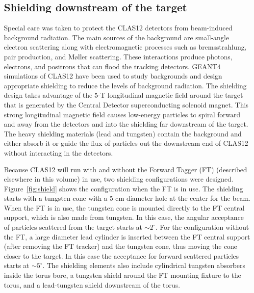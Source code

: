 \subsection{Shielding downstream of the target} 

Special care was taken to protect the CLAS12 detectors from beam-induced background radiation. The main sources of the background are 
small-angle electron scattering along with electromagnetic processes such as bremsstrahlung, pair production, and M{\o}ller scattering. 
These interactions produce photons, electrons, and positrons that can flood the tracking detectors. GEANT4 simulations of CLAS12
have been used to study backgrounds and design appropriate shielding to reduce the levels of background radiation.  The shielding design
takes advantage of the 5-T longitudinal magnetic field around the target that is generated by the Central Detector superconducting solenoid 
magnet. This strong longitudinal magnetic field causes low-energy particles to spiral forward and away from the detectors and into the 
shielding far downstream of the target. The heavy shielding materials (lead and tungsten) contain the background and either absorb it or 
guide the flux of particles out the downstream end of CLAS12 without interacting in the detectors. 

Because CLAS12 will run with and without the Forward Tagger (FT) (described elsewhere in this volume) in use, two shielding 
configurations were designed. Figure~\ref{fig:shield} shows the configuration when the FT is in use. The shielding starts with a 
tungsten cone with a 5-cm diameter hole at the center for the beam. When the FT is in use, the tungsten cone is mounted directly 
to the FT central support, which is also made from tungsten. In this case, the angular acceptance of particles scattered from the target 
starts at $\sim 2^\circ$. For the configuration without the FT, a large diameter lead cylinder is inserted between the FT central support 
(after removing the FT tracker) and the tungsten cone, thus moving the cone closer to the target. In this case the acceptance for forward 
scattered particles starts at $\sim 5^\circ$. The shielding elements also include cylindrical tungsten absorbers inside the torus bore, a 
tungsten shield around the FT mounting fixture to the torus, and a lead-tungsten shield downstream of the torus.  

